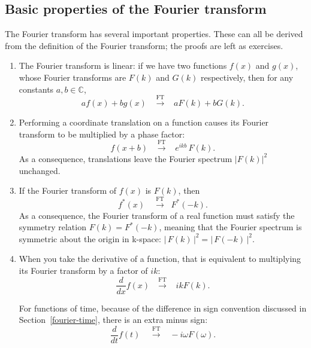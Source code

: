 \documentclass[10pt,a4paper]{article}
\begin{document}
\subsection{Basic properties of the Fourier transform}
\label{fourier-basic-properties}

The Fourier transform has several important properties. These can all be
derived from the definition of the Fourier transform; the proofs are
left as exercises.

\begin{enumerate}
\item
  The Fourier transform is linear: if we have two functions $f(x)$ and
  $g(x)$, whose Fourier transforms are $F(k)$ and $G(k)$
  respectively, then for any constants $a, b \in \mathbb{C}$,
  \begin{equation}
    a f(x) + b g(x) \;\;\;  \overset{\mathrm{FT}}{\longrightarrow} \;\;\;
    a F(k) + b G(k).
\end{equation}

\item
  Performing a coordinate translation on a function causes its Fourier
  transform to be multiplied by a phase factor:
  \begin{equation}
    f(x+b) \;\;\;  \overset{\mathrm{FT}}{\longrightarrow} \;\;\;
    e^{ikb} \, F(k).
  \end{equation}
  As a consequence, translations leave the Fourier spectrum $|F(k)|^2$
  unchanged.

\item
  If the Fourier transform of $f(x)$ is $F(k)$, then
  \begin{equation}
    f^*(x) \quad  \overset{\mathrm{FT}}{\longrightarrow} \;\; F^*(-k).
  \end{equation}
  As a consequence, the Fourier transform of a real function must
  satisfy the symmetry relation $F(k) = F^*(-k)$, meaning that the
  Fourier spectrum is symmetric about the origin in k-space:
  $\big|\,F(k)\,\big|^2 = \big|\,F(-k)\,\big|^2.$

\item
  When you take the derivative of a function, that is equivalent to
  multiplying its Fourier transform by a factor of $ik$:
  \begin{equation}
    \frac{d}{dx} f(x) \,\;\;  \overset{\mathrm{FT}}{\longrightarrow} \;\;\;
    ik F(k).
  \end{equation}

  For functions of time, because of the difference in sign convention
  discussed in Section~\ref{fourier-time}, there is an extra minus
  sign:
  \begin{equation}
    \frac{d}{dt} f(t) \;\;\;\;  \overset{\mathrm{FT}}{\longrightarrow} \;\;\;
    -i\omega F(\omega).
  \end{equation}
\end{enumerate}
\end{document}
